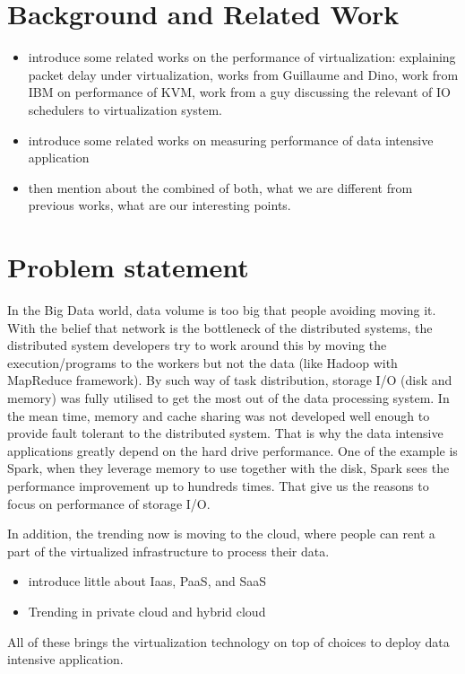 \documentclass{acmsig}
\begin{document}

\section{Background and Related Work}
\begin{itemize}
  \item introduce some related works on the performance of virtualization: explaining packet delay under virtualization, works from Guillaume and Dino, work from IBM on performance of KVM, work from a guy discussing the relevant of IO schedulers to virtualization system.
  \item introduce some related works on measuring performance of data intensive application
 \item then mention about the combined of both, what we are different from previous works, what are our interesting points.
\end{itemize}
\section{Problem statement}

In the Big Data world, data volume is too big that people avoiding moving it. With the belief that network is the bottleneck of the distributed systems, the distributed system developers try to work around this by moving the execution/programs to the workers but not the data (like Hadoop with MapReduce framework). By such way of task distribution, storage I/O (disk and memory) was fully utilised to get the most out of the data processing system. In the mean time, memory and cache sharing was not developed well enough to provide fault tolerant to the distributed system. That is why the data intensive applications greatly depend on the hard drive performance. One of the example is Spark, when they leverage memory to use together with the disk, Spark sees the performance improvement up to hundreds times. That give us the reasons to focus on performance of storage I/O.

In addition, the trending now is moving to the cloud, where people can rent a part of the virtualized infrastructure to process their data.
\begin{itemize}
 \item introduce little about Iaas, PaaS, and SaaS
 \item Trending in private cloud and hybrid cloud
\end{itemize}
All of these brings the virtualization technology on top of choices to deploy data intensive application.
\end{document}
